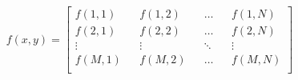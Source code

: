 \documentclass[../main.tex]{subfiles}%
\begin{document}
%
    \Xequation%
    \begin{equation}%
        f(x,y) =%
        \begin{bmatrix}%
            f(1,1) && f(1,2) && \dots && f(1,N) \\%
            f(2,1) && f(2,2) && \dots && f(2,N) \\%
            \vdots && \vdots && \ddots && \vdots \\%
            f(M,1) && f(M,2) && \dots && f(M,N) \\%
        \end{bmatrix}%
        \label{eq:image-matrix-function}%
    \end{equation}%
\end{document}
